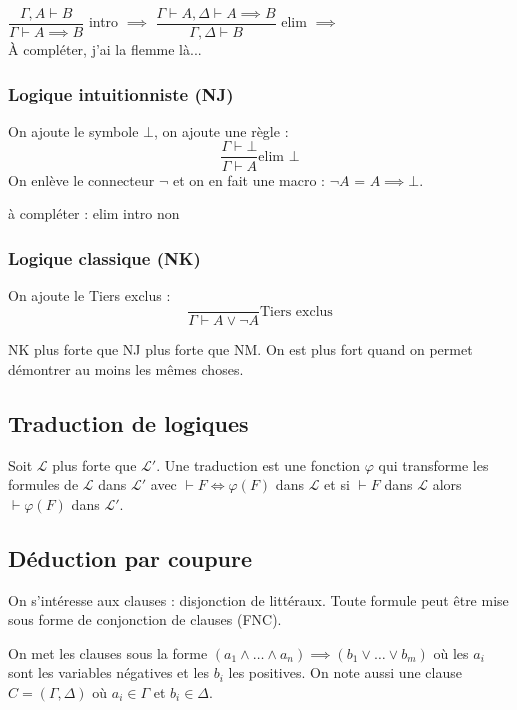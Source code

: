 \documentclass[french]{article}
\begin{document}
$\dfrac{\Gamma ,A\vdash B}{\Gamma\vdash A\implies B}$ intro $\implies$ 
$\dfrac{\Gamma\vdash A, \Delta\vdash A\implies B}{\Gamma ,\Delta\vdash B}$ elim $\implies$\\

À compléter, j'ai la flemme là...

\subsubsection{Logique intuitionniste (NJ)}
On ajoute le symbole $\bot$, on ajoute une règle :
$$\frac{\Gamma\vdash\bot}{\Gamma\vdash A}\text{elim $\bot$}$$
On enlève le connecteur $\neg$ et on en fait une macro : $\neg A$ = $A\implies\bot$.

à compléter : elim intro non

\subsubsection{Logique classique (NK)}
On ajoute le Tiers exclus :
$$\dfrac{}{\Gamma\vdash A\vee\neg A}\text{Tiers exclus}$$

NK plus forte que NJ plus forte que NM. On est plus fort quand on permet démontrer au moins les mêmes choses.
 
\subsection{Traduction de logiques}
Soit $\mathcal{L}$ plus forte que $\mathcal{L}'$. Une traduction est une fonction $\varphi$ qui transforme les formules de $\mathcal{L}$ dans $\mathcal{L}'$ avec $\vdash F \Longleftrightarrow \varphi(F)$ dans $\mathcal{L}$ et si $\vdash F$ dans $\mathcal{L}$ alors $\vdash\varphi (F)$ dans $\mathcal{L}'$. 


\subsection{Déduction par coupure}
On s'intéresse aux clauses : disjonction de littéraux. Toute formule peut être mise sous forme de conjonction de clauses (FNC).

On met les clauses sous la forme $(a_1\wedge\dots\wedge a_n)\implies (b_1\vee\dots\vee b_m)$ où les $a_i$ sont les variables négatives et les $b_i$ les positives. On note aussi une clause $C=(\Gamma,\Delta)$ où $a_i\in\Gamma$ et $b_i\in\Delta$.
\end{document}

